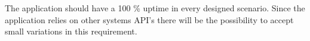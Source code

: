 The application should have a 100 \% uptime in every designed scenario. Since the application relies on other systems API’s there will be the possibility to accept small variations in this requirement.